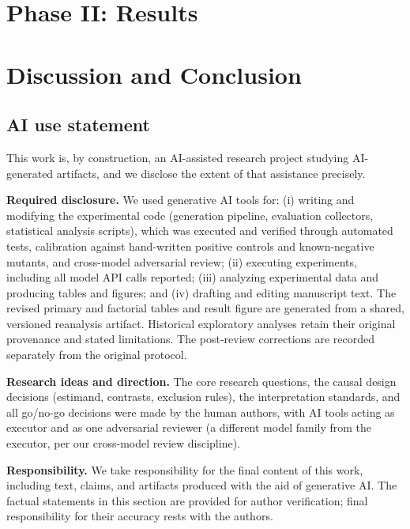\documentclass{article}
\begin{document}
\section{Phase II: Results}\label{sec:results}


\section{Discussion and Conclusion}\label{sec:discussion}




\label{endofmain}

\subsection*{AI use statement}

This work is, by construction, an AI-assisted research project studying
AI-generated artifacts, and we disclose the extent of that assistance precisely.

\textbf{Required disclosure.} We used generative AI tools for: (i) writing and
modifying the experimental code (generation pipeline, evaluation collectors,
statistical analysis scripts), which was executed and verified through automated
tests, calibration against hand-written positive controls and known-negative
mutants, and cross-model adversarial review; (ii) executing experiments,
including all model API calls reported; (iii) analyzing experimental data and
producing tables and figures; and (iv) drafting and editing manuscript text.
The revised primary and factorial tables and result figure are generated
from a shared, versioned reanalysis artifact. Historical exploratory analyses
retain their original provenance and stated limitations. The post-review
corrections are recorded separately from the original protocol.

\textbf{Research ideas and direction.} The core research questions, the causal
design decisions (estimand, contrasts, exclusion rules), the interpretation
standards, and all go/no-go decisions were made by the human authors, with AI
tools acting as executor and as one adversarial reviewer (a different model
family from the executor, per our cross-model review discipline).

\textbf{Responsibility.} We take responsibility for the final content of this
work, including text, claims, and artifacts produced with the aid of generative
AI. The factual statements in this section are provided for author verification;
final responsibility for their accuracy rests with the authors.




\appendix


\end{document}
